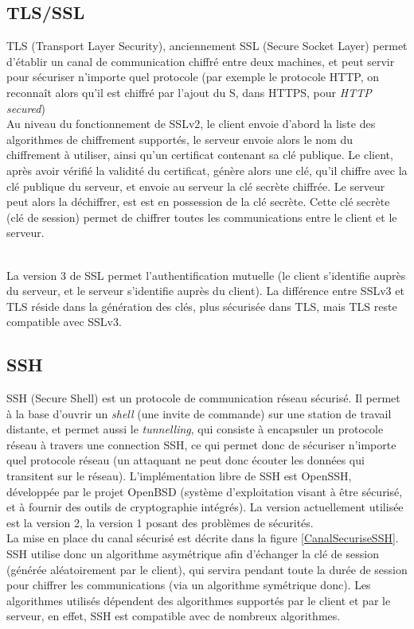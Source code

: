 \subsection{TLS/SSL}
TLS (Transport Layer Security), anciennement SSL (Secure Socket
Layer) permet d'établir un canal de communication chiffré entre
deux machines, et peut servir pour sécuriser n'importe quel
protocole (par exemple le protocole HTTP, on reconnaît alors qu'il
est chiffré par l'ajout du S, dans HTTPS, pour \emph{HTTP
secured})
\\
 
Au niveau du fonctionnement de SSLv2, le client envoie d'abord la liste des
algorithmes de chiffrement supportés, le serveur envoie alors le
nom du chiffrement à utiliser, ainsi qu'un
certificat contenant sa clé publique. Le client, après avoir
vérifié la validité du certificat, génère alors une clé, qu'il
chiffre avec la clé publique du serveur, et envoie au serveur la
clé secrète chiffrée. Le serveur peut alors la déchiffrer, est est
en possession de la clé secrète.
Cette clé secrète (clé de session) permet de chiffrer toutes les
communications entre le client et le serveur.

\\
La version 3 de SSL permet l'authentification mutuelle (le client
s'identifie auprès du serveur, et le serveur s'identifie auprès du
client). La différence entre SSLv3 et TLS réside dans la
génération des clés, plus sécurisée dans TLS, mais TLS reste
compatible avec SSLv3.

\subsection{SSH}
SSH (Secure Shell) est un protocole de communication réseau
sécurisé. Il permet à la base d'ouvrir un \emph{shell} (une invite
de commande) sur une station de travail distante, et permet aussi
le \emph{tunnelling}, qui consiste à encapsuler un protocole
réseau à travers une connection SSH, ce qui permet donc de
sécuriser n'importe quel protocole réseau (un attaquant ne peut
donc écouter les données qui transitent sur le réseau).
L'implémentation libre de SSH est OpenSSH, développée par le
projet OpenBSD (système d'exploitation visant à être sécurisé, et
à fournir des outils de cryptographie intégrés). La version
actuellement utilisée est la version 2, la version 1 posant des
problèmes de sécurités.
\\

La mise en place du canal sécurisé est décrite dans la figure
\ref{CanalSecuriseSSH}. SSH utilise donc un algorithme asymétrique
afin d'échanger la clé de session (générée aléatoirement par le
client), qui servira pendant toute la
durée de session pour chiffrer les communications (via un
algorithme symétrique donc). Les algorithmes utilisés dépendent
des algorithmes supportés par le client et par le serveur, en
effet, SSH est compatible avec de nombreux algorithmes.


